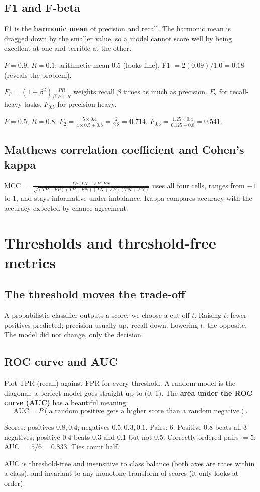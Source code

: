 \subsection{F1 and F-beta}
F1 is the \textbf{harmonic mean} of precision and recall. The harmonic mean is dragged down by the smaller value, so a model
cannot score well by being excellent at one and terrible at the other.
\begin{example}
$P = 0.9$, $R = 0.1$: arithmetic mean 0.5 (looks fine), F1 $= 2(0.09)/1.0 = 0.18$ (reveals the problem).
\end{example}
$F_\beta = (1 + \beta^2)\frac{PR}{\beta^2P + R}$ weights recall $\beta$ times as much as precision. $F_2$ for recall-heavy tasks,
$F_{0.5}$ for precision-heavy.
\begin{example}[: F-beta]
$P = 0.5$, $R = 0.8$: $F_2 = \frac{5\times0.4}{4\times0.5 + 0.8} = \frac{2}{2.8} = 0.714$. $F_{0.5} = \frac{1.25\times0.4}{0.125 + 0.8} = 0.541$.
\end{example}

\subsection{Matthews correlation coefficient and Cohen's kappa}
MCC $= \frac{TP\cdot TN - FP\cdot FN}{\sqrt{(TP+FP)(TP+FN)(TN+FP)(TN+FN)}}$ uses all four cells, ranges from $-1$ to $1$, and stays
informative under imbalance. Kappa compares accuracy with the accuracy expected by chance agreement.

\section{Thresholds and threshold-free metrics}

\subsection{The threshold moves the trade-off}
A probabilistic classifier outputs a score; we choose a cut-off $t$. Raising $t$: fewer positives predicted; precision
usually up, recall down. Lowering $t$: the opposite. The model did not change, only the decision.

\subsection{ROC curve and AUC}
Plot TPR (recall) against FPR for every threshold. A random model is the diagonal; a perfect model goes straight up to (0, 1).
The \textbf{area under the ROC curve (AUC)} has a beautiful meaning:
\[ \text{AUC} = P(\text{a random positive gets a higher score than a random negative}). \]
\begin{example}
Scores: positives $0.8, 0.4$; negatives $0.5, 0.3, 0.1$. Pairs: 6. Positive 0.8 beats all 3 negatives; positive 0.4 beats 0.3 and
0.1 but not 0.5. Correctly ordered pairs $= 5$; AUC $= 5/6 = 0.833$. Ties count half.
\end{example}
AUC is threshold-free and insensitive to class balance (both axes are rates within a class), and invariant to any monotone transform
of scores (it only looks at order).

